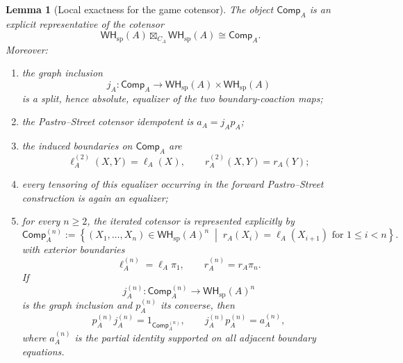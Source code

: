 \documentclass[oneside]{article}
\newcommand{\WH}{\mathsf{WH}}
\theoremstyle{plain}
\newtheorem{lemma}[theorem]{Lemma}
\theoremstyle{definition}
\theoremstyle{remark}
\begin{document}
\begin{lemma}[Local exactness for the game cotensor]
\label{lem:cgqg-local-pastro-street-exactness}
    The object \(\mathsf{Comp}_A\) is an explicit representative of the cotensor
    \begin{equation}
        \WH_{\mathrm{sp}}(A)
        \boxtimes_{C_A}
        \WH_{\mathrm{sp}}(A)
        \cong
        \mathsf{Comp}_A.
        \label{eq:cgqg-game-cotensor-boundary-pullback}
    \end{equation}
    Moreover:
    \begin{enumerate}
        \item the graph inclusion
        \[
            j_A:
            \mathsf{Comp}_A
            \longrightarrow
            \WH_{\mathrm{sp}}(A)\times\WH_{\mathrm{sp}}(A)
        \]
        is a split, hence absolute, equalizer of the two boundary-coaction maps;

        \item the Pastro--Street cotensor idempotent is \(a_A=j_Ap_A\);

        \item the induced boundaries on \(\mathsf{Comp}_A\) are
        \[
            \ell_A^{(2)}(X,Y)=\ell_A(X),
            \qquad
            r_A^{(2)}(X,Y)=r_A(Y);
        \]

        \item every tensoring of this equalizer occurring in the forward Pastro--Street construction is again an equalizer;

        \item for every \(n\geq2\), the iterated cotensor is represented explicitly by
        \begin{equation}
            \mathsf{Comp}_A^{(n)}
            :=
            \left\{
                (X_1,\ldots,X_n)
                \in
                \WH_{\mathrm{sp}}(A)^n
                \;\middle|\;
                r_A(X_i)=\ell_A(X_{i+1})
                \text{ for }1\leq i<n
            \right\}.
            \label{eq:cgqg-local-ps-iterated-comp}
        \end{equation}
        with exterior boundaries
        \[
            \ell_A^{(n)}=\ell_A\pi_1,
            \qquad
            r_A^{(n)}=r_A\pi_n.
        \]
        If
        \[
            j_A^{(n)}:
            \mathsf{Comp}_A^{(n)}
            \longrightarrow
            \WH_{\mathrm{sp}}(A)^n
        \]
        is the graph inclusion and \(p_A^{(n)}\) its converse, then
        \[
            p_A^{(n)}j_A^{(n)}
            =
            1_{\mathsf{Comp}_A^{(n)}},
            \qquad
            j_A^{(n)}p_A^{(n)}
            =
            a_A^{(n)},
        \]
        where \(a_A^{(n)}\) is the partial identity supported on all adjacent boundary equations.
    \end{enumerate}
\end{lemma}
\end{document}
